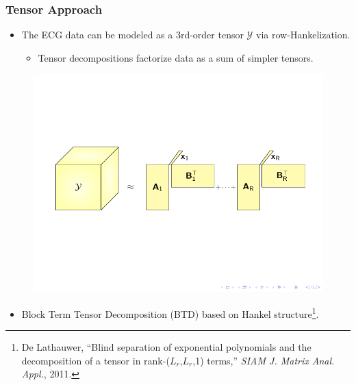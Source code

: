 \documentclass{beamer}
\begin{document}
	\begin{frame}
		\frametitle{Tensor Approach}
		
		\begin{itemize}
			\item The ECG data can be modeled as a 3rd-order tensor ${\mathcal{Y}}$ via row-Hankelization.
			\begin{itemize}
				\item Tensor decompositions factorize data as a sum of simpler tensors.
			\end{itemize}
		\end{itemize}
		\vspace{-0.7cm}
		\begin{figure}[htb]
			\centering
			\includegraphics[scale=0.8,clip=true,trim={0.8cm 6.5cm 0.6cm 6.2cm}]{tikz_BTDY.pdf}
		\end{figure}
		\vspace{2.3cm}
		\begin{itemize}
			\item Block Term Tensor Decomposition (BTD) based on Hankel structure\footnote{De Lathauwer, ``Blind separation of exponential polynomials and the decomposition of a tensor in rank-($L_{r}$,$L_{r}$,1) terms,'' \textit{SIAM J. Matrix Anal. Appl.}, 2011.}.
		\end{itemize}
	\end{frame}
		
\end{document}

